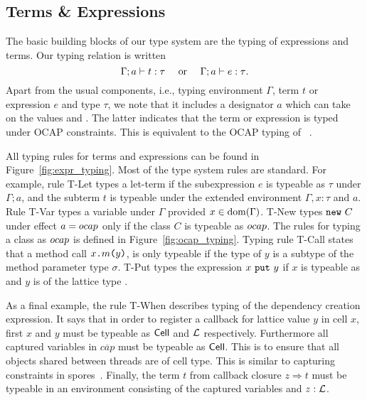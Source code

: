 \subsection{Terms \& Expressions}%
\label{sub:terms_and_expressions}

The basic building blocks of our type system are the typing of expressions and
terms. Our typing relation is written
\begin{equation}
  \mbox{$\Gamma;a\vdash t:\tau$} \quad \text{ or } \quad
  \mbox{$\Gamma;a\vdash e:\tau$}. \notag
\end{equation}
Apart from the usual components, i.e., typing environment $\Gamma$, term $t$ or
expression $e$ and type $\tau$, we note that it includes a designator $a$ which
can take on the values \nocap{} and \ocap{}. The latter indicates that the term
or expression is typed under OCAP constraints. This is equivalent to the OCAP
typing of \LaCasa{}~\parencite{conf/oopsla/HallerL16}. 

All typing rules for terms and expressions can be found in
Figure~\ref{fig:expr_typing}. Most of the type system rules are standard. For
example, rule {\sc T-Let} types a let-term if the subexpression $e$ is typeable
as $\tau$ under $\Gamma; a$, and the subterm $t$ is typeable under the extended
environment $\Gamma, x: \tau$ and $a$. Rule {\sc T-Var} types a variable under
$\Gamma$ provided $x \in \mbox{$\mathrm{dom}$}(\Gamma)$. {\sc T-New} types $\mbox{\mdseries\texttt{new}~$C$}$ under effect
$a = \mbox{$ocap$}$ only if the class $C$ is typeable as $\mbox{$ocap$}$. The rules for typing a
class as $\mbox{$ocap$}$ is defined in Figure~\ref{fig:ocap_typing}. Typing rule {\sc
T-Call} states that a method call $\mbox{\mdseries$x$\texttt{.}$m$\texttt{(}$y$\texttt{)}}$, is only typeable if the type
of $y$ is a subtype of the method parameter type $\sigma$. {\sc T-Put} types the
expression $\mbox{\mdseries$x$~\texttt{put}~$y$}$ if $x$ is typeable as \CellType{} and $y$ is of the lattice
type \LatType.

As a final example, the rule {\sc T-When} describes typing of the dependency
creation expression. It says that in order to register a callback for lattice
value $y$ in cell $x$, first $x$ and $y$ must be typeable as $\mbox{$\mathsf{Cell}$}$ and
$\mbox{$\mathcal{L}$}$ respectively. Furthermore all captured variables in $\overline{cap}$
must be typeable as $\mbox{$\mathsf{Cell}$}$. This is to ensure that all objects shared
between threads are of cell type. This is similar to capturing constraints in
spores~\parencite{conf/ecoop/MillerHO14}. Finally, the term $t$ from callback
closure $z \Rightarrow t$ must be typeable in an environment consisting of the
captured variables and $z: \mbox{$\mathcal{L}$}$.


